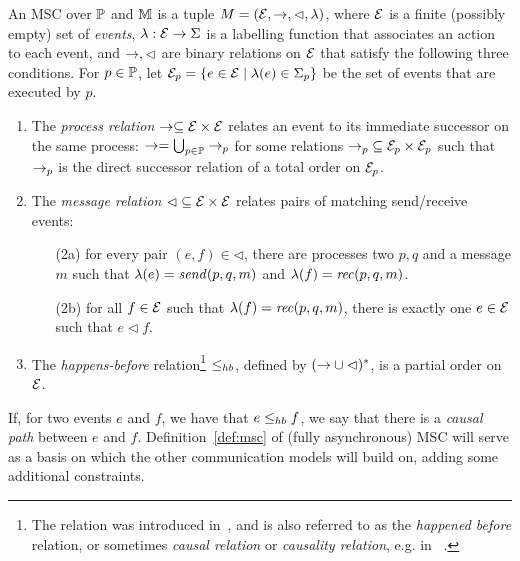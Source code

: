\begin{definition}[MSC]\label{def:msc}
	An {MSC}  over $\mathbb{P}$ and $\mathbb{M}$ is a tuple $M = (\mathcal{E},\to,\lhd,\lambda)$, where 
	$\mathcal{E}$ is a finite (possibly empty) set of \emph{events}, $\lambda: \mathcal{E} \to \Sigma$ is a labelling 
	function that associates an action to each event,
	and $\to,\lhd$ are binary relations on $\mathcal{E}$ that satisfy the following three conditions.
	For $p \in \mathbb{P}$, let $\mathcal{E}_p = \{e \in \mathcal{E} \mid \lambda(e) \in \Sigma_{p}\}$ be 
	the set of events that are executed by $p$. 
	\begin{enumerate}
		\item The \emph{process relation} $\to\subseteq \mathcal{E} \times \mathcal{E}$ 
		relates an event to its immediate successor on
		the same process:
		$\to=\bigcup_{p \in \mathbb{P}} \to_p$ for some 
		relations ${\to_p} \subseteq \mathcal{E}_p \times \mathcal{E}_p$ such that $\to_p$ is 
		the direct successor relation of a total order on $\mathcal{E}_p$.  
		\item The \emph{message relation} ${\lhd} \subseteq \mathcal{E} \times \mathcal{E}$ 
		relates pairs of matching send/receive events: 	
		\begin{enumerate}%
			\item[(2a)] for every pair $(e,f) \in {\lhd}$, there are processes two $p,q$ and a message $m$ such that $\lambda(e) = \mathit{send}(p, q, m)$ and $\lambda(f) = \mathit{rec}(p, q, m)$.
			\item[(2b)] for all $f \in \mathcal{E}$ such that $\lambda(f) = \mathit{rec}(p, q, m)$, %
			there is exactly one $e \in \mathcal{E}$ such that $e \lhd f$.
		\end{enumerate}
		\item The \emph{happens-before} relation\footnote{The relation was introduced in~\cite{Lamport78}, and is also referred to as the \emph{happened before} relation,
		or sometimes \emph{causal relation} or \emph{causality relation}, e.g. in~\cite{DBLP:journals/dc/Charron-BostMT96,DBLP:conf/cav/BouajjaniEJQ18} .} ${\leq_{hb}}$, defined by $({\to} \cup {\lhd})^\ast$,
		is a partial order on $\mathcal{E}$.
	\end{enumerate}
\end{definition}

 If, for two events $e$ and $f$, we have that $e \leq_{hb} f$, we   say that there is a \emph{causal path} between $e$ and $f$.
Definition~\ref{def:msc} of (fully asynchronous) MSC will serve as a basis on which the other communication models will build on, adding some additional constraints.

